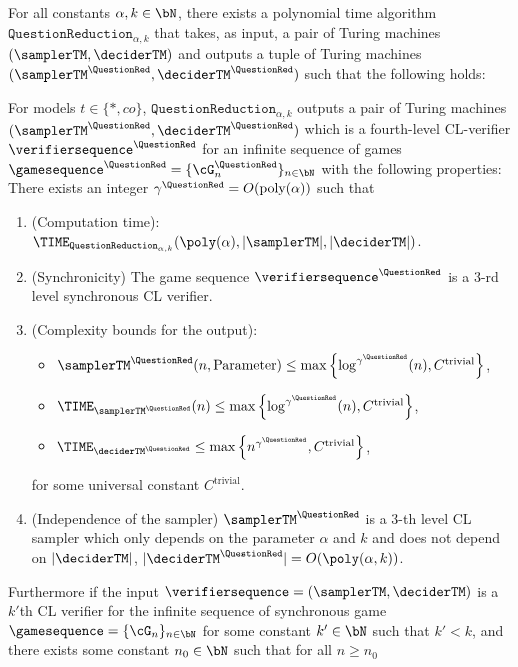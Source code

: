 \begin{proposition} \label{prop:QuestionReduction}
	For all constants $\alpha,k \in \bN$, there exists a polynomial time algorithm $\texttt{QuestionReduction}_{\alpha, k}$ that takes, as input, a pair of Turing machines $(\samplerTM, \deciderTM)$ and outputs a tuple of Turing machines $(\samplerTM^{\QuestionRed}, \deciderTM^{\QuestionRed})$ such that the following holds:
	
	For models $t \in \{*, co\}$, $\texttt{QuestionReduction}_{\alpha, k}$ outputs a pair of Turing machines $(\samplerTM^{\QuestionRed}, \deciderTM^{\QuestionRed})$ which is a fourth-level CL-verifier $\verifiersequence^{\QuestionRed}$ for an infinite sequence of games $\gamesequence^{\QuestionRed} = \{\cG_n^{\QuestionRed} \}_{n \in \bN}$ with the following properties: There exists an integer $\gamma^{\QuestionRed} = O(\text{poly}(\alpha)) $ such that
	\begin{enumerate}
		\item (Computation time): $\TIME_{\texttt{QuestionReduction}_{\alpha, k}} (\poly(\alpha), |\samplerTM|, |\deciderTM|)$. 
		\item (Synchronicity) The game sequence $\verifiersequence^{\QuestionRed}$ is a $3$-rd level synchronous CL verifier. 
		\item (Complexity bounds for the output):
		\begin{itemize}
			\item  $\samplerTM^{\QuestionRed}(n, \text{Parameter}) \leq \max\left\{\log^{\gamma^{\QuestionRed}}(n), C^{\text{trivial}}\right\}$, 
			\item  $\TIME_{ \samplerTM^{\QuestionRed} }(n) \leq \max\left\{\log^{\gamma^{\QuestionRed}}(n),C^{\text{trivial}}\right\} $,
			\item  $\TIME_{ \deciderTM^{\QuestionRed}} \leq \max\left\{n^{\gamma^{\QuestionRed}},C^{\text{trivial}}\right\}$,
		\end{itemize}
		for some universal constant $C^{\text{trivial}}$. 
		\item (Independence of the sampler) $\samplerTM^{\QuestionRed}$ is a $3$-th level CL sampler which only depends on the parameter $\alpha$ and $k$ and does not depend on $|\deciderTM|$, $|\deciderTM^{\QuestionRed}| =  O(\poly( \alpha, k))$. 
	\end{enumerate}
	Furthermore if the input $\verifiersequence = (\samplerTM, \deciderTM)$ is a $k'$th CL verifier for the infinite sequence of synchronous game $\gamesequence = \{\cG_n\}_{n \in \bN}$ for some constant $k' \in \bN$ such that $k' < k$, and there exists some constant $n_0 \in \bN$ such that for all $n \geq n_0$

\end{proposition}
